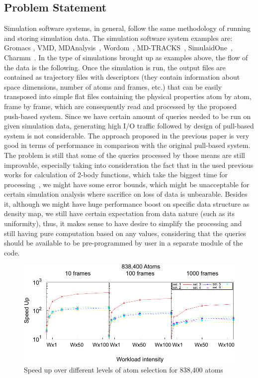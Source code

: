\documentclass[10pt,journal,final,letterpaper,twocolumn]{IEEEtran}
\begin{document}
\subsection{Problem Statement}
Simulation software systems, in general, follow the same methodology of running and storing simulation data. The simulation software system examples are: Gromacs \cite{GROMACS4}, VMD\cite{VMD}, MDAnalysis~\cite{MDAnalysis}, Wordom~\cite{wordom}, MD-TRACKS~\cite{MDtracks}, SimulaidOne~\cite{Simulaid}, Charmm~\cite{CHARMM}. In the type of simulations brought up as examples above, the flow of the data is the following. Once the simulation is run, the output files are contained as trajectory files with descriptors (they contain information about space dimensions, number of atoms and frames, etc.) that can be easily transposed into simple flat files containing the physical properties atom by atom, frame by frame, which are consequently read and processed by the proposed push-based system. Since we have certain amount of queries needed to be run on given simulation data, generating high I/O traffic followed by design of pull-based system is not considerable. The approach proposed in the previous paper is very good in terms of performance in comparison with the original pull-based system\cite{mainPaper}. The problem is still that some of the queries processed by those means are still improvable, especially taking into consideration the fact that in the used previous works for calculation of 2-body functions, which take the biggest time for processing~\cite{ytu:icde09, EDBT12}, we might have some error bounds, which might be unacceptable for certain simulation analysis where sacrifice on loss of data is unbearable. Besides it, although we might have huge performance boost on specific data structure as density map, we still have certain expectation from data nature (such as its uniformity), thus, it makes sense to have desire to simplify the processing and still having pure computation based on any values, considering that the queries should be available to be pre-programmed by user in a separate module of the code.


\begin{figure}
 \centerline{ \includegraphics[width=1\columnwidth]{images/speedup838K-pomalo-za-4-eps-converted-to.pdf} }
 \caption{ Speed up over different levels of atom selection for 838,400 atoms \cite{mainPaper}}
 \label{fg:sample_estimation_old_paper}
\end{figure}
\end{document}
